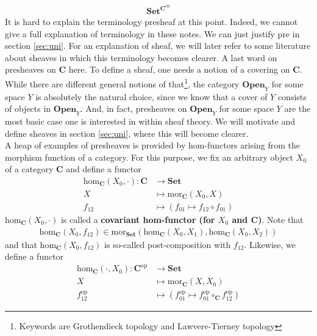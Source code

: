 \begin{align*}
  \mathbf{Set}^{\mathbf{C}^{\mathrm{op}}}
\end{align*}
It is hard to explain the terminology {\glqq}presheaf{\grqq} at this point.
Indeed, we cannot give a full explanation of terminology in these notes.
We can just justify {\glqq}pre{\grqq} in section \ref{sec:uni}.
For an explanation of {\glqq}sheaf{\grqq}, we will later refer to some literature about sheaves in which this terminology becomes clearer.
A last word on presheaves on $\mathbf{C}$ here.
To define a sheaf, one needs a notion of a covering on $\mathbf{C}$.
While there are different general notions of that\footnote{Keywords are Grothendieck topology and Lawvere-Tierney topology}, the category $\mathbf{Open}_{Y}$ for some space $Y$ is absolutely the natural choice, since we know that a cover of $Y$ consists of objects in $\mathbf{Open}_{Y}$.
And, in fact, presheaves on $\mathbf{Open}_{Y}$ for some space $Y$ are the most basic case one is interested in within sheaf theory.
We will motivate and define sheaves in section \ref{sec:uni}, where this will become clearer.
\\
A heap of examples of presheaves is provided by hom-functors arising from the morphism function of a category.
For this purpose, we fix an arbitrary object $X_{0}$ of a category $\mathbf{C}$ and define a functor
\begin{align*}
  \mathrm{hom}_{\mathbf{C}}(X_{0},\cdot)
  \colon
  \mathbf{C}
  &\rightarrow
  \mathbf{Set}
  \\
  X
  &\mapsto
  \mathrm{mor}_{\mathbf{C}}(X_{0},X)
  \\
  f_{12}
  &\mapsto
  \left(
    f_{01}
    \mapsto
    f_{12}
    \circ
    f_{01}
  \right)
\end{align*}
$\mathrm{hom}_{\mathbf{C}}(X_{0},\cdot)$ is called a \textbf{covariant hom-functor (for $X_{0}$ and $\mathbf{C}$)}.
Note that
\begin{align*}
  \mathrm{hom}_{\mathbf{C}}(X_{0},f_{12})
  \in
  \mathrm{mor}_{\mathbf{Set}}
  \left(
    \mathrm{hom}_{\mathbf{C}}(X_{0},X_{1}),
    \mathrm{hom}_{\mathbf{C}}(X_{0},X_{2})
  \right)
\end{align*}
and that $\mathrm{hom}_{\mathbf{C}}(X_{0},f_{12})$ is so-called post-composition with $f_{12}$.
Likewise, we define a functor
\begin{align*}
  \mathrm{hom}_{\mathbf{C}}(\cdot,X_{0})
  \colon
  \mathbf{C}^{\mathrm{op}}
  &\rightarrow
  \mathbf{Set}
  \\
  X
  &\mapsto
  \mathrm{mor}_{\mathbf{C}}(X,X_{0})
  \\
  f_{12}^{\mathrm{op}}
  &\mapsto
  \left(
    f_{01}^{\mathrm{op}}
    \mapsto
    f_{01}^{\mathrm{op}}
    \circ_{\mathbf{C}}
    f_{12}^{\mathrm{op}}
  \right)
\end{align*}
